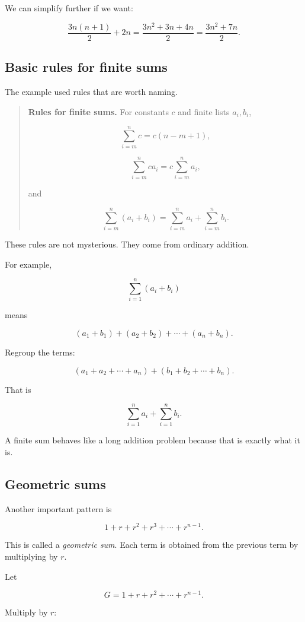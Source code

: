 We can simplify further if we want:

\[
\frac{3n(n+1)}{2}+2n
=
\frac{3n^2+3n+4n}{2}
=
\frac{3n^2+7n}{2}.
\]

\subsection{Basic rules for finite sums}
\label{subsec:basic-rules-for-finite-sums}

The example used rules that are worth naming.

\begin{quote}
\textbf{Rules for finite sums.}
For constants \(c\) and finite lists \(a_i,b_i\),

\[
\boxed{
\sum_{i=m}^{n} c
=
c(n-m+1),
}
\]

\[
\boxed{
\sum_{i=m}^{n} c a_i
=
c\sum_{i=m}^{n} a_i,
}
\]

and

\[
\boxed{
\sum_{i=m}^{n} (a_i+b_i)
=
\sum_{i=m}^{n} a_i+\sum_{i=m}^{n} b_i.
}
\]
\end{quote}

These rules are not mysterious.  They come from ordinary addition.

For example,

\[
\sum_{i=1}^{n}(a_i+b_i)
\]

means

\[
(a_1+b_1)+(a_2+b_2)+\cdots+(a_n+b_n).
\]

Regroup the terms:

\[
(a_1+a_2+\cdots+a_n)+(b_1+b_2+\cdots+b_n).
\]

That is

\[
\sum_{i=1}^{n} a_i+\sum_{i=1}^{n} b_i.
\]

A finite sum behaves like a long addition problem because that is exactly what it is.

\subsection{Geometric sums}
\label{subsec:geometric-sums}

Another important pattern is

\[
1+r+r^2+r^3+\cdots+r^{n-1}.
\]

This is called a \emph{geometric sum}.  Each term is obtained from the previous term
by multiplying by \(r\).

Let

\[
G=1+r+r^2+\cdots+r^{n-1}.
\]

Multiply by \(r\):

